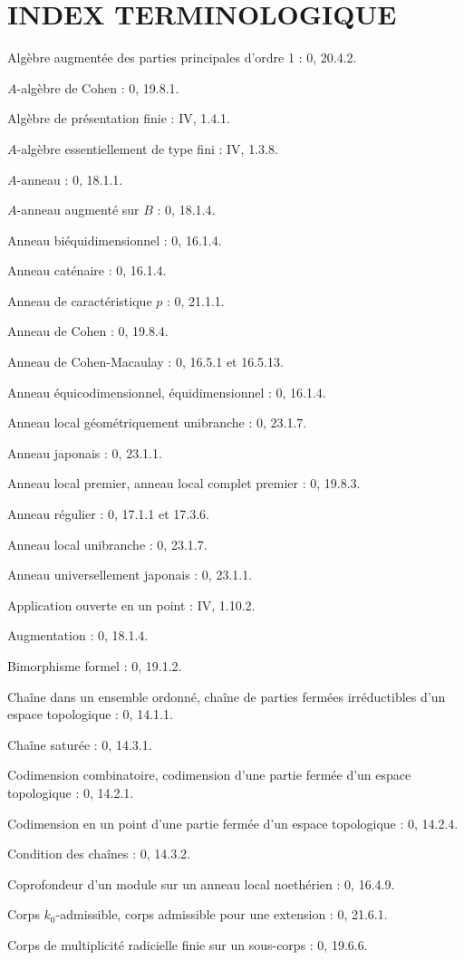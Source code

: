 \documentclass[10pt,oneside]{book}
\newcommand{\oldpage}[2][]{%
  \setcounter{footnote}{0}%
  \marginpar{\scriptsize\textbf{#1}~|~#2}\ignorespaces}
\begin{document}
\clearpage
\oldpage[IV-1]{254}
{}
\section*{INDEX TERMINOLOGIQUE}

Algèbre augmentée des parties principales d'ordre 1 : 0, 20.4.2.\par
$A$-algèbre de Cohen : 0, 19.8.1.\par
Algèbre de présentation finie : IV, 1.4.1.\par
$A$-algèbre essentiellement de type fini : IV, 1.3.8.\par
$A$-anneau : 0, 18.1.1.\par
$A$-anneau augmenté sur $B$ : 0, 18.1.4.\par
Anneau biéquidimensionnel : 0, 16.1.4.\par
Anneau caténaire : 0, 16.1.4.\par
Anneau de caractéristique $p$ : 0, 21.1.1.\par
Anneau de Cohen : 0, 19.8.4.\par
Anneau de Cohen-Macaulay : 0, 16.5.1 et 16.5.13.\par
Anneau équicodimensionnel, équidimensionnel : 0, 16.1.4.\par
Anneau local géométriquement unibranche : 0, 23.1.7.\par
Anneau japonais : 0, 23.1.1.\par
Anneau local premier, anneau local complet premier : 0, 19.8.3.\par
Anneau régulier : 0, 17.1.1 et 17.3.6.\par
Anneau local unibranche : 0, 23.1.7.\par
Anneau universellement japonais : 0, 23.1.1.\par
Application ouverte en un point : IV, 1.10.2.\par
Augmentation : 0, 18.1.4.\par

Bimorphisme formel : 0, 19.1.2.\par

Chaîne dans un ensemble ordonné, chaîne de parties fermées irréductibles d'un espace topologique : 0, 14.1.1.\par
Chaîne saturée : 0, 14.3.1.\par
Codimension combinatoire, codimension d'une partie fermée d'un espace topologique : 0, 14.2.1.\par
Codimension en un point d'une partie fermée d'un espace topologique : 0, 14.2.4.\par
Condition des chaînes : 0, 14.3.2.\par
Coprofondeur d'un module sur un anneau local noethérien : 0, 16.4.9.\par
Corps $k_0$-admissible, corps admissible pour une extension : 0, 21.6.1.\par
Corps de multiplicité radicielle finie sur un sous-corps : 0, 19.6.6.\par
\end{document}
